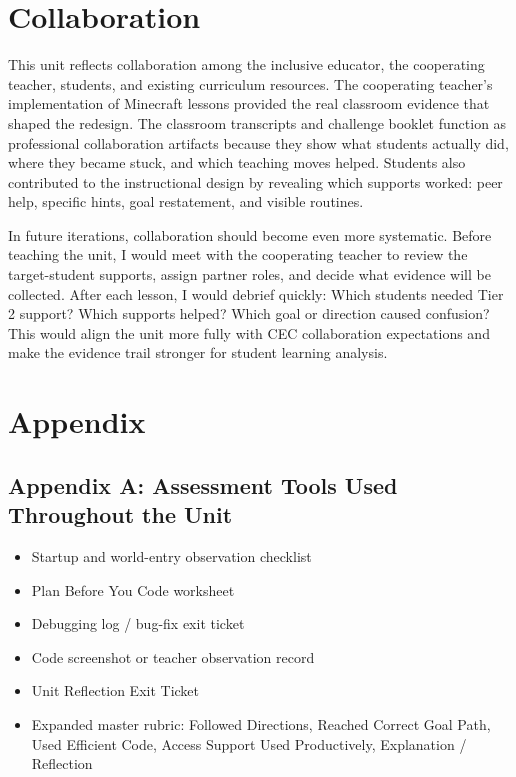 \documentclass[12pt]{article}
\begin{document}
\section{Collaboration}
This unit reflects collaboration among the inclusive educator, the cooperating teacher, students, and existing curriculum resources. The cooperating teacher's implementation of Minecraft lessons provided the real classroom evidence that shaped the redesign. The classroom transcripts and challenge booklet function as professional collaboration artifacts because they show what students actually did, where they became stuck, and which teaching moves helped. Students also contributed to the instructional design by revealing which supports worked: peer help, specific hints, goal restatement, and visible routines.

In future iterations, collaboration should become even more systematic. Before teaching the unit, I would meet with the cooperating teacher to review the target-student supports, assign partner roles, and decide what evidence will be collected. After each lesson, I would debrief quickly: Which students needed Tier 2 support? Which supports helped? Which goal or direction caused confusion? This would align the unit more fully with CEC collaboration expectations and make the evidence trail stronger for student learning analysis.

\section{Appendix}
\subsection{Appendix A: Assessment Tools Used Throughout the Unit}
\begin{itemize}
\item Startup and world-entry observation checklist
\item Plan Before You Code worksheet
\item Debugging log / bug-fix exit ticket
\item Code screenshot or teacher observation record
\item Unit Reflection Exit Ticket
\item Expanded master rubric: Followed Directions, Reached Correct Goal Path, Used Efficient Code, Access Support Used Productively, Explanation / Reflection
\end{itemize}
\end{document}

